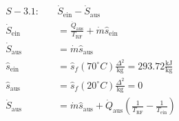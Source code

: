 

\item[b)] 
    \begin{align*}
        S - 3.1: \quad & \dot{S}_{\text{ein}} - \dot{S}_{\text{aus}} \\
        \dot{S}_{\text{ein}} &= \frac{\dot{Q}_{\text{aus}}}{T_{\text{RF}}} + \dot{m} \hat{s}_{\text{ein}} \\
        \dot{S}_{\text{aus}} &= \dot{m} \hat{s}_{\text{aus}} \\
        \hat{s}_{\text{ein}} &= \hat{s}_f (70^\circ C) \frac{\Delta^2}{\text{kg}} = 293.72 \frac{\text{kJ}}{\text{kg}} \\
        \hat{s}_{\text{aus}} &= \hat{s}_f (20^\circ C) \frac{\Delta^2}{\text{kg}} = 0 \\
        \dot{S}_{\text{aus}} &= \dot{m} \hat{s}_{\text{aus}} + \dot{Q}_{\text{aus}} \left( \frac{1}{T_{\text{RF}}} - \frac{1}{T_{\text{ein}}} \right)
    \end{align*}